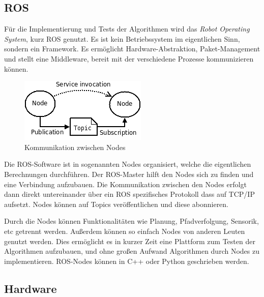 \documentclass[11pt,a4paper]{article}
\begin{document}
{\subsection{ROS}


F\"ur die Implementierung und Tests der Algorithmen wird das \textit{Robot Operating System}, kurz ROS genutzt. Es ist kein Betriebssystem im eigentlichen Sinn, sondern ein Framework. Es erm\"oglicht Hardware-Abstraktion, Paket-Management und stellt eine Middleware, bereit mit der verschiedene Prozesse kommunizieren k\"onnen. \cite{rosWiki}

\begin{figure}[h]
	\includegraphics[width=\linewidth]{pictures/ROS_basic_concepts.png}
	\caption{Kommunikation zwischen Nodes}
\end{figure}

Die ROS-Software ist in sogenannten Nodes organisiert, welche die eigentlichen Berechnungen durchf\"uhren. Der ROS-Master hilft den Nodes sich zu finden und eine Verbindung aufzubauen. Die Kommunikation zwischen den Nodes erfolgt dann direkt untereinander \"uber ein ROS spezifisches Protokoll dass auf TCP/IP aufsetzt. Nodes k\"onnen auf Topics ver\"offentlichen und diese abonnieren. \cite{rosConcepts}

Durch die Nodes k\"onnen Funktionalit\"aten wie Planung, Pfadverfolgung, Sensorik, etc getrennt werden. Au{\ss}erdem k\"onnen so einfach Nodes von anderen Leuten genutzt werden. Dies erm\"oglicht es in kurzer Zeit eine Plattform zum Testen der Algorithmen aufzubauen, und ohne gro{\ss}en Aufwand Algorithmen durch Nodes zu implementieren. ROS-Nodes k\"onnen in C++ oder Python geschrieben werden.

\subsection{Hardware}
 
}
\end{document}
